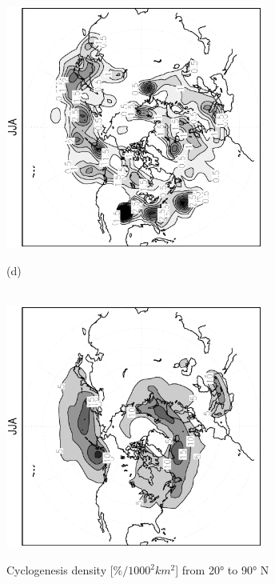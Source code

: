 \documentclass[12pt,a4paper,twoside,openright,headinclude,liststotoc,bibtotoc]{scrreprt}
\begin{document}
\begin{appendix}
\begin{figure}[c]
{\includegraphics[height=8.0cm,angle=-90]
{eps/cyclgen_PLASIM_T21_45JJA.eps}
}
\parbox{8.5cm}{\hspace{0.95cm}\begin{scriptsize}(d)\end{scriptsize} \vspace{-0.5cm} \\
\includegraphics[height=8.0cm,angle=-90]
{eps/cycldensity_ERA40_T21_45JJA.eps}
}
\caption[Cyclogenesis density Northern Hemisphere]{Cyclogenesis density [$\%/1000^2 km^2$] from 20° to 90° N}
\label{img:NHyclgen}
\end{figure}



\end{appendix}
\end{document}
